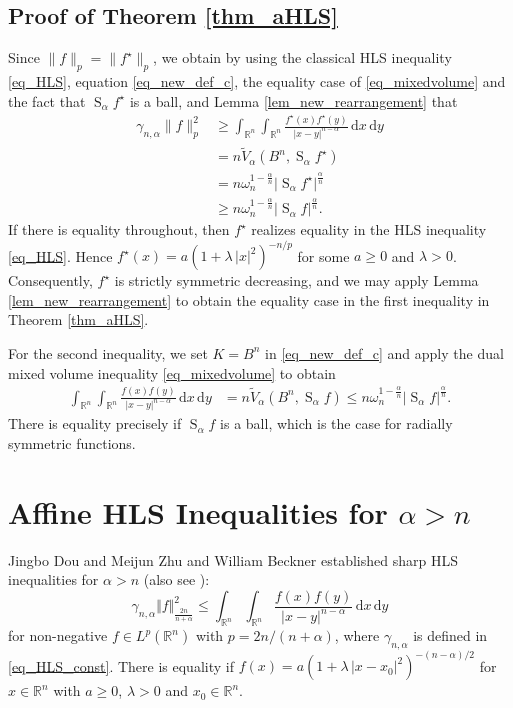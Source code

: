 \documentclass{amsart}
\newcommand{\R}{\mathbb R}
\newcommand{\B}{{B^n}}
\renewcommand{\d}{\,\mathrm{d}}
\newcommand{\vol}[1]{\vert #1\vert}
\newcommand{\hls}[1]{\operatorname{S}_{#1}\!} %
\begin{document}
\subsection{Proof of Theorem \ref{thm_aHLS}}
Since $\|f\|_p=\|f^\star\|_p$, we obtain by using  the classical HLS inequality \eqref{eq_HLS}, equation \eqref{eq_new_def_c}, the equality case of \eqref{eq_mixedvolume} and the fact that $\hls\alpha f^\star$ is a ball, and Lemma \ref{lem_new_rearrangement} that
\begin{align}
	\gamma_{n,\alpha} \|f\|_p^2 
	&\geq \int_{\R^n}\int_{\R^n} \frac{f^\star(x)f^\star(y)}{|x-y|^{n-\alpha}} \d x \d y \\
	&= n \tilde V_\alpha (\B, \hls \alpha f^\star)\\
	&= n \omega_n^{{1-\frac \alpha n}} \vol{\hls\alpha f^\star}^{\frac\alpha n}\\
	&\geq n \omega_n^{{1-\frac \alpha n}} \vol{\hls\alpha f}^{\frac\alpha n}.
\end{align}
If there is equality throughout, then $f^\star$ realizes equality in the HLS inequality \eqref{eq_HLS}. Hence $f^\star(x) = a (1 + \lambda\, | x|^2)^{-n/p}$ for some $a\ge0$ and $\lambda>0$. Consequently, $f^\star$ is strictly symmetric decreasing, and we may apply Lemma \ref{lem_new_rearrangement} to obtain the equality case in the first inequality in Theorem \ref{thm_aHLS}.

For the second inequality, we set $K=\B$ in \eqref{eq_new_def_c} and apply the dual mixed volume inequality \eqref{eq_mixedvolume} to obtain
\begin{align}
    \int_{\R^n}\int_{\R^n} \frac{f(x)f(y)}{\vert x-y\vert^{n-\alpha}}\d x\d y
    &= n \tilde V_{\alpha}(\B, \hls \alpha f)
    \leq n \omega_n^{1-\frac{\alpha} n} \vol{\hls \alpha f}^{\frac\alpha n}.
\end{align}
There is equality precisely if $\hls \alpha f$ is a ball, which is the case for radially symmetric functions.

\section{Affine HLS Inequalities for $\alpha>n$}\label{sec_reverse_HLS}

Jingbo Dou and Meijun Zhu \cite{DouZhu15}  and William Beckner \cite{Beckner2015} established sharp HLS inequalities for $\alpha>n$ (also see \cite{NgoNguyen17, carrillo2019reverse}):
\begin{equation}\label{eq_HLS2}
\gamma_{n,\alpha}\Vert f\Vert_{\frac{2n}{n+\alpha}}^2\le 
\int_{\R^n}\int_{\R^n} \frac{f(x) f(y)}{\vert x-y\vert^{n-\alpha}} \d x\d y
\end{equation}
for non-negative $f\in L^p(\R^n)$  with $p = {2n}/({n+\alpha})$, where $\gamma_{n,\alpha}$ is defined in \eqref{eq_HLS_const}. There is equality if $f(x) = a (1 + \lambda\,|x-x_0|^2)^{-(n-\alpha)/2}$ for $x\in\R^n$ with $a\ge 0$, $\lambda>0$ and $x_0\in\R^n$.
\end{document}
